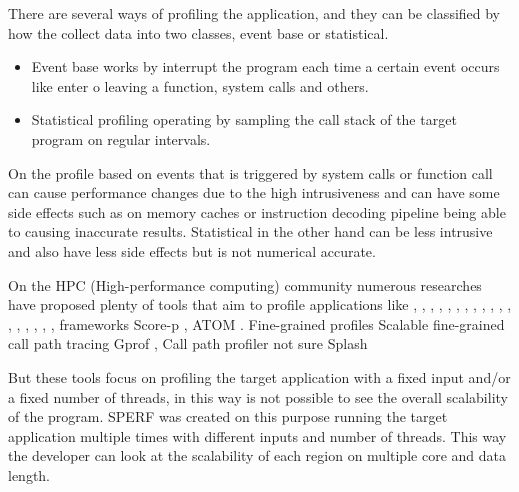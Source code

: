 \documentclass[sigconf]{acmart}
\begin{document}
There are several ways of profiling the application, and they can be classified by how the collect data into two classes, event base or statistical.

\begin{itemize}
\item Event base works by interrupt the program each time a certain event occurs like enter o leaving a function, system calls and others.
\item Statistical profiling operating by sampling the call stack of the target program on regular intervals.
\end{itemize}

On the profile based on events that is triggered by system calls or function call can cause performance changes due to the high intrusiveness and can have some side effects such as on memory caches or instruction decoding pipeline being able to causing inaccurate results. Statistical in the other hand can be less intrusive and also have less side effects but is not numerical accurate.

On the HPC (High-performance computing) community numerous researches have proposed plenty of tools that aim to profile applications like \cite{Kufrin2005}, \cite{Servat2016}, \cite{Morris2010},
\cite{Graham1982}, \cite{Shende2006}, \cite{Malony2014}
\cite{Servat2013}, \cite{Servat2013}, \cite{Adhianto2010a} \cite{Chittimalli2012}, \cite{Tiku1971}, \cite{Knupfer2012}, \cite{Southern2016},
\cite{Woo1995}, \cite{Bienia2008}, \cite{Bienia2010} \cite{Adhianto2010}, \cite{Srivastava}, \cite{Tallent}
\cite{Architecture2015}, \cite{Tiku1971a}, \cite{Tallent}
\cite{Adhianto2010}, \cite{Srivastava}
frameworks Score-p \citep{Knupfer2012}, ATOM \cite{Srivastava}. Fine-grained profiles Scalable fine-grained call path tracing \cite{Tallent} 
Gprof \cite{Graham1982}, Call path profiler \cite{Adhianto2010} not sure Splash \cite{Woo1995} 

But these tools focus on profiling the target application with a fixed input and/or a fixed number of threads, in this way is not possible to see the overall scalability of the program. SPERF was created on this purpose running the target application multiple times with different inputs and number of threads. This way the developer can look at the scalability of each region on multiple core and data length.

\end{document}
